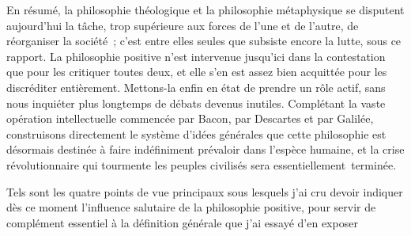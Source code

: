 \documentclass[french,twoside]{book} %
\begin{document}
En résumé, la philosophie théologique et la philosophie métaphysique se disputent aujourd’hui la tâche, trop supérieure aux forces de l’une et de l’autre, de réorganiser la société ; c’est entre elles seules que subsiste encore la lutte, sous ce rapport. La philosophie positive n’est intervenue jusqu’ici dans la contestation que pour les critiquer toutes deux, et elle s’en est assez bien acquittée pour les discréditer entièrement. Mettons-la enfin en état de prendre un rôle actif, sans nous inquiéter plus longtemps de débats devenus inutiles. Complétant la vaste opération intellectuelle commencée par Bacon, par Descartes et par Galilée, construisons directement le système d’idées générales que cette philosophie est désormais destinée à faire indéfiniment prévaloir dans l’espèce humaine, et la crise révolutionnaire qui tourmente les peuples civilisés sera essentiellement terminée.\par
Tels sont les quatre points de vue principaux sous lesquels j’ai cru devoir indiquer dès ce moment l’influence salutaire de la philosophie positive, pour servir de complément essentiel à la définition générale que j’ai essayé d’en exposer
\end{document}
